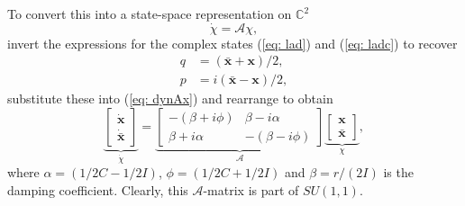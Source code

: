 To convert this into a state-space representation on $\mathbb{C}^{2}$
\begin{equation}
    \dot{\chi} = \mathcal{A} \chi ,
\end{equation}
invert the expressions for the complex states (\ref{eq: lad}) and (\ref{eq: ladc}) to recover
 \begin{align}
\label{eq: q}
    q &= (\bar{\textbf{x}}+\textbf{x})/2,\\
\label{eq: p}    
    p &= i(\bar{\textbf{x}}-\textbf{x})/2,
\end{align}
 substitute these into (\ref{eq: dynAx}) and rearrange to obtain
\begin{equation}
\label{eq: achi}
    \underbrace{\begin{bmatrix}
    \dot{\textbf{x}}\\\dot{\bar{\textbf{x}}}
    \end{bmatrix}}_{\dot{\chi}}=\underbrace{ \begin{bmatrix}
    -(\beta+i\phi) &\beta-i\alpha\\
    \beta+i\alpha  &-(\beta-i\phi) 
    \end{bmatrix}}_{\mathcal{A}}
    \underbrace{\begin{bmatrix}
    \textbf{x}\\\bar{\textbf{x}}
    \end{bmatrix}}_{\chi},
\end{equation}
where $\alpha=  (1/2C-1/2I)$, $\phi= (1/2C+1/2I)$ and $\beta=r/(2I)$ is the damping coefficient. %
Clearly, this $\mathcal{A}$-matrix is part of $SU(1,1)$.




